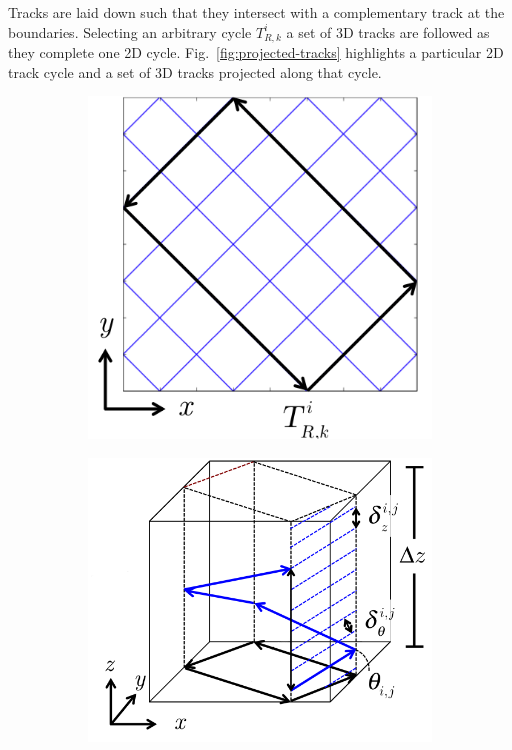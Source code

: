 Tracks are laid down such that they intersect with a complementary track at the boundaries. Selecting an arbitrary cycle $T_{R,k}^{i}$ a set of 3D tracks are followed as they complete one 2D cycle. Fig.~\ref{fig:projected-tracks} highlights a particular 2D track cycle and a set of 3D tracks projected along that cycle.

\begin{figure}[h!]
	\centering
	\begin{subfigure}{0.35\textwidth}
		\centering
		\vspace{0.15in}
		\includegraphics[width=\linewidth]{figures/laydown/track_cycles_3_a.png}
		\caption{}
		\label{fig:projected-tracks-a}
	\end{subfigure}
	\begin{subfigure}{0.45\textwidth}
		\centering
		\includegraphics[width=\linewidth]{figures/laydown/track_cycles_3_b.png}

\end{subfigure}
\end{figure}
